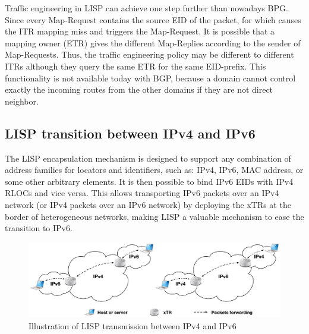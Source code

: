 Traffic engineering in LISP can achieve one step further than nowadays BPG. Since every Map-Request contains the source EID of the packet, for which causes the ITR mapping miss and triggers the Map-Request. It is possible that a mapping owner (ETR) gives the different Map-Replies according to the sender of Map-Requests. Thus, the traffic engineering policy may be different to different ITRs although they query the same ETR for the same EID-prefix. This functionality is not available today with BGP, because a domain cannot control exactly the incoming routes from the other domains if they are not direct neighbor.


\subsection{LISP transition between IPv4 and IPv6}
\label{subsubsec:transmission}
The LISP encapsulation mechanism is designed to support any combination of address families for locators and identifiers, such as: IPv4, IPv6, MAC address, or some other arbitrary elements. It is then possible to bind IPv6 EIDs with IPv4 RLOCs and vice versa. This allows transporting IPv6 packets over an IPv4 network (or IPv4 packets over an IPv6 network) by deploying the xTRs at the border of heterogeneous networks, making LISP a valuable mechanism to ease the transition to IPv6.
\begin{figure}[!t]
	\centering
	\includegraphics[width=\textwidth]{Pics/transmission_ipv4_ipv6.eps}
	\caption{Illustration of LISP transmission between IPv4 and IPv6}
	\label{transmission_ipv4_ipv6}
\end{figure}

